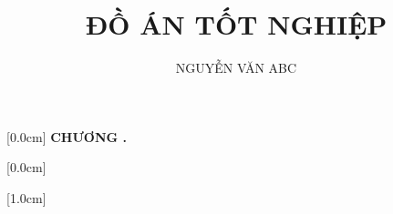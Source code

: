 \documentclass[a4paper, twoside]{report}
\title{\bf ĐỒ ÁN TỐT NGHIỆP} %
\author{NGUYỄN VĂN ABC} %
\theoremstyle{definition} %
\begin{document}
	
	\pagestyle{plain} %
	
	\newpage
	
	
	\newpage
	
	
	\newpage
	
	
	\newpage
	
	
	\newpage
	\renewcommand*\contentsname{MỤC LỤC}
	
	
	[0.0cm]             %
	{\bfseries\vspace{0.3cm}}                  %
	{{\bfseries{\scshape}
			CHƯƠNG \thecontentslabel.\ }}
	{}         %
	{\contentspage}         %
	
	
	[0.0cm]             %
	{\vspace{0.3cm}}                  %
	{\thecontentslabel \ } %
	{}         %
	{\contentspage}         %
	
	[1.0cm]             %
	{\vspace{0.3cm}}                  %
	{\thecontentslabel \ } %
	{}         %
	{\contentspage}         %
	
	\tableofcontents
	\thispagestyle{empty}
	\cleardoublepage
	
	\newpage
	\renewcommand{\listfigurename}{DANH MỤC HÌNH VẼ}
	{\let\oldnumberline\numberline
		\renewcommand{\numberline}{Hình~\oldnumberline}
		\listoffigures} 
		
	
	\renewcommand{\listtablename}{DANH MỤC BẢNG BIỂU}
	{\let\oldnumberline\numberline
		\renewcommand{\numberline}{Bảng~\oldnumberline}
		\listoftables}
	
	
	
\end{document}
